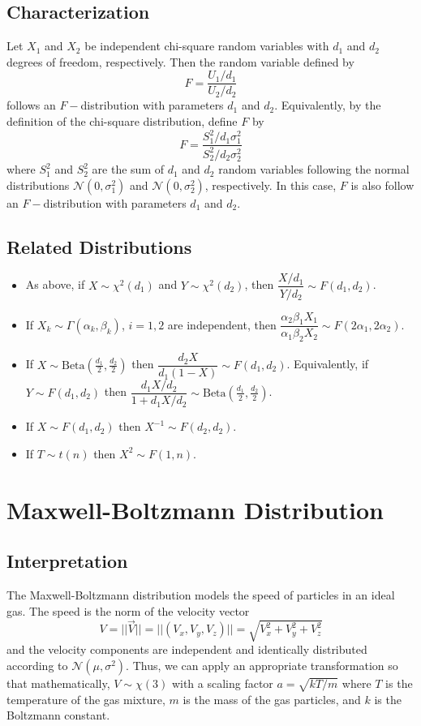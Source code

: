 \documentclass[1pt]{report}
\newcommand{\<}{\langle}
\renewcommand{\>}{\rangle}
\newcommand{\NN}{\mathcal{N}}
\begin{document}
\subsection{Characterization}
Let $X_1$ and $X_2$ be independent chi-square random variables with $d_1$ and $d_2$ degrees of freedom, respectively. Then the random variable defined by
$$F = \frac{U_1/d_1}{U_2/d_2}$$
follows an $F-$distribution with parameters $d_1$ and $d_2$. Equivalently, by the definition of the chi-square distribution, define $F$ by
$$F = \dfrac{S_1^2/d_1\sigma_1^2}{S_2^2/d_2\sigma_2^2}$$
where $S_1^2$ and $S_2^2$ are the sum of $d_1$ and $d_2$ random variables following the normal distributions $\NN(0, \sigma_1^2)$ and $\NN(0,\sigma_2^2)$, respectively. In this case, $F$ is also follow an $F-$distribution with parameters $d_1$ and $d_2$.
\subsection{Related Distributions}
\begin{itemize}
\item As above, if $X \sim \chi^2(d_1)$ and $Y\sim \chi^2(d_2)$, then $\dfrac{X/d_1}{Y/d_2} \sim F(d_1, d_2)$.
\item If $X_k \sim \Gamma(\alpha_k,\beta_k)$, $i = 1,2$ are independent, then $\dfrac{\alpha_2\beta_1X_1}{\alpha_1\beta_2 X_2}\sim F(2\alpha_1, 2\alpha_2)$.
\item If $X \sim \text{Beta}\left(\frac{d_1}{2}, \frac{d_2}{2}\right)$ then $\dfrac{d_2 X}{d_1(1-X)} \sim F(d_1, d_2)$. Equivalently, if $Y \sim F(d_1, d_2)$ then $\dfrac{d_1 X/d_2}{1+d_1 X/d_2} \sim \text{Beta}\left(\frac{d_1}{2}, \frac{d_2}{2}\right)$.
\item If $X \sim F(d_1, d_2)$ then $X^{-1} \sim F(d_2, d_2)$.
\item If $T \sim t(n)$ then $X^2 \sim F(1,n)$.
\end{itemize}
\newpage
\section{Maxwell-Boltzmann Distribution}
\subsection{Interpretation}
The Maxwell-Boltzmann distribution models the speed of particles in an ideal gas. The speed is the norm of the velocity vector
$$V = || \vec V || = ||(V_x, V_y, V_z)|| = \sqrt{V_x^2 + V_y^2 + V_z^2}$$
and the velocity components are independent and identically distributed according to $\NN(\mu, \sigma^2)$. Thus, we can apply an appropriate transformation so that mathematically, $V \sim \chi(3)$ with a scaling factor $a = \sqrt{kT/m}$ where $T$ is the temperature of the gas mixture, $m$ is the mass of the gas particles, and $k$ is the Boltzmann constant. 
\end{document}

